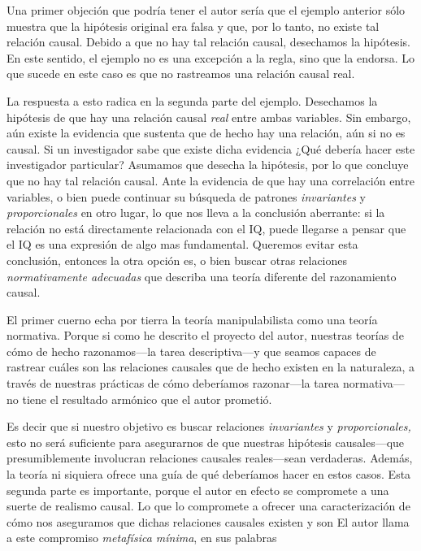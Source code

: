 {{Una primer objeción que podría tener el autor sería que el
ejemplo anterior sólo muestra que la hipótesis original era
falsa y que, por lo tanto, no existe tal relación causal.
Debido a que no hay tal relación causal, desechamos la
hipótesis. En este sentido,  el ejemplo no es una excepción
a la regla, sino que la endorsa. Lo que sucede en este caso
es que no rastreamos una relación causal real.

La respuesta a esto radica en la segunda parte del ejemplo.
Desechamos la hipótesis de que hay una relación causal
\emph{real} entre ambas variables. Sin embargo, aún existe
la evidencia que sustenta que de hecho hay una relación, aún
si no es causal. Si un investigador sabe que existe dicha
evidencia ¿Qué debería hacer este investigador particular?
Asumamos que desecha la hipótesis, por lo que concluye que
no hay tal relación causal. Ante la evidencia de que hay una
correlación entre variables, o bien puede continuar su
búsqueda de patrones \emph{invariantes} y
\emph{proporcionales} en otro lugar, lo que nos lleva a la
conclusión aberrante: si la relación no está directamente
relacionada con el IQ, puede llegarse a pensar que el IQ es
una expresión de algo mas fundamental. Queremos evitar esta
conclusión, entonces la otra opción es, o bien buscar otras
relaciones \emph{normativamente adecuadas} que describa una
teoría diferente del razonamiento causal.

El primer cuerno echa por tierra la teoría manipulabilista
como una teoría normativa. Porque si como he descrito el
proyecto del autor, nuestras teorías de cómo de hecho
razonamos---la tarea descriptiva---y que seamos capaces de
rastrear cuáles son las relaciones causales que de hecho
existen en la naturaleza, a través de nuestras prácticas de
cómo deberíamos razonar---la tarea normativa---no tiene el
resultado armónico que el autor prometió.

Es decir que si nuestro objetivo es buscar relaciones
\emph{invariantes} y \emph{proporcionales,} esto no será
suficiente para asegurarnos de que nuestras hipótesis
causales---que presumiblemente involucran relaciones
causales reales---sean verdaderas. Además, la teoría ni
siquiera ofrece una guía de qué deberíamos hacer en estos
casos. Esta segunda parte es importante, porque el autor en
efecto se compromete a una suerte de realismo causal. Lo
que lo compromete a ofrecer una caracterización de cómo nos
aseguramos que dichas relaciones causales existen y son
 El autor llama a este compromiso
\emph{metafísica mínima}, en sus palabras


}}
